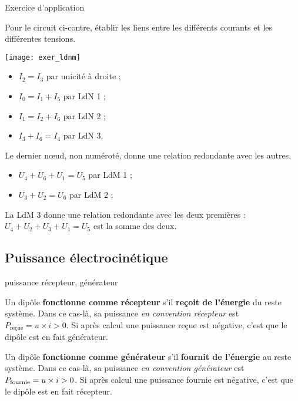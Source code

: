 \documentclass[../main/main.tex]{subfiles}
\begin{document}
\begin{NCcexe}[breakable]{Exercice d'application}

    \begin{minipage}{0.30\linewidth}
        Pour le circuit ci-contre, établir les liens entre les différents
        courants et les différentes tensions.
    \end{minipage}
    \begin{minipage}{0.70\linewidth}
        \texttt{[image: exer\_ldnm]}
    \end{minipage}
    \tcblower
    \begin{minipage}{0.47\linewidth}
        \begin{itemize}
            \item $I_2 = I_3$ par unicité à droite ;
            \item $I_0 = I_1 + I_5$ par LdN 1 ;
            \item $I_1 = I_2 + I_6$ par LdN 2 ;
            \item $I_3 + I_6 = I_4$ par LdN 3.
        \end{itemize}
        Le dernier nœud, non numéroté, donne une relation redondante avec les
        autres.
    \end{minipage}
    \hfill
    \begin{minipage}{0.47\linewidth}
        \begin{itemize}
            \item $U_4 + U_6 + U_1 = U_5$ par LdM 1 ;
            \item $U_3 + U_2 = U_6$ par LdM 2 ;
        \end{itemize}
        La LdM 3 donne une relation redondante avec les deux premières : $U_4
        + U_2 + U_3 + U_1 = U_5$ est la somme des deux.
    \end{minipage}
\end{NCcexe}

\subsection{Puissance électrocinétique}

\begin{defi}[label=def:puissance]{puissance récepteur, générateur}

    Un dipôle \textbf{fonctionne comme récepteur} s'il \textbf{reçoit de
    l'énergie} du reste système. Dans ce cas-là, sa puissance \textit{en
    convention récepteur} est $P_{\text{reçue}} = u\times i > 0$. Si après
    calcul une puissance reçue est négative, c'est que le dipôle est en fait
    générateur. \tcblower

    Un dipôle \textbf{fonctionne comme générateur} s'il \textbf{fournit de
    l'énergie} au reste système. Dans ce cas-là, sa puissance \textit{en
    convention générateur} est $P_{\rm fournie} = u\times i > 0$. Si après
    calcul une puissance fournie est négative, c'est que le dipôle est en fait
    récepteur.
    
\end{defi}
\end{document}
